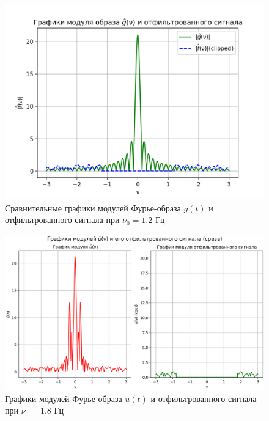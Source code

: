 \begin{figure}[ht!]
    \centering
    \includegraphics[scale=0.55]{media/1 task/low_freq/Fourier_Image_Comparison_4_2_2-1,1981981981981982.png}
    \caption{Сравнительные графики модулей Фурье-образа $g(t)$ и отфильтрованного сигнала при $\nu_0=1.2$ Гц}
    \label{fig:fourc_4_2_2_1.2}
\end{figure}

\begin{figure}[ht!]
    \centering
    \includegraphics[scale=0.55]{media/1 task/low_freq/Fourier_Image_4_2_2-1,7987987987987988.png}
    \caption{Графики модулей Фурье-образа $u(t)$ и отфильтрованного сигнала при $\nu_0=1.8$ Гц}
    \label{fig:four_4_2_2_1.8}
\end{figure}

\clearpage

